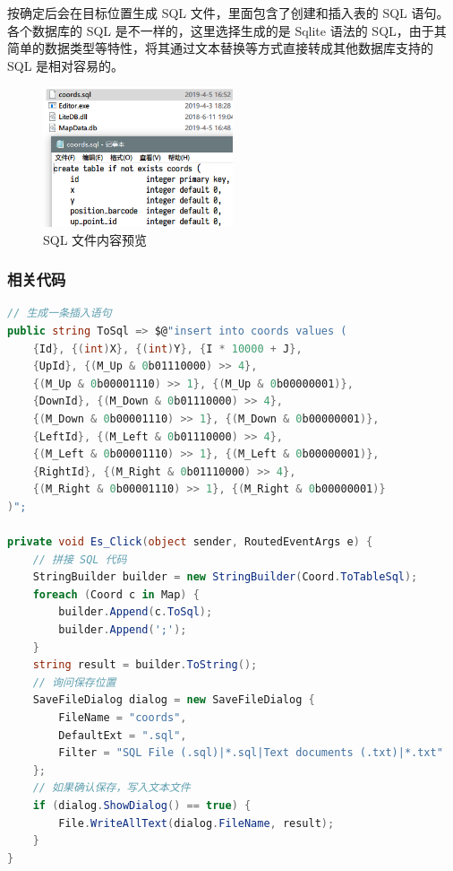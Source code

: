 按确定后会在目标位置生成 SQL 文件，里面包含了创建和插入表的 SQL 语句。各个数据库的 SQL 是不一样的，这里选择生成的是 Sqlite 语法的 SQL，由于其简单的数据类型等特性，将其通过文本替换等方式直接转成其他数据库支持的 SQL 是相对容易的。

\begin{figure}[H]
  \centering
  \includegraphics[width=0.5\textwidth]{assets/sql.png}
  \caption{SQL 文件内容预览}
  \label{fig:sql}
\end{figure}

\subsubsection{相关代码}

\begin{lstlisting}[language=cs]
// 生成一条插入语句
public string ToSql => $@"insert into coords values (
    {Id}, {(int)X}, {(int)Y}, {I * 10000 + J},
    {UpId}, {(M_Up & 0b01110000) >> 4},
    {(M_Up & 0b00001110) >> 1}, {(M_Up & 0b00000001)},
    {DownId}, {(M_Down & 0b01110000) >> 4},
    {(M_Down & 0b00001110) >> 1}, {(M_Down & 0b00000001)},
    {LeftId}, {(M_Left & 0b01110000) >> 4},
    {(M_Left & 0b00001110) >> 1}, {(M_Left & 0b00000001)},
    {RightId}, {(M_Right & 0b01110000) >> 4},
    {(M_Right & 0b00001110) >> 1}, {(M_Right & 0b00000001)}
)";

private void Es_Click(object sender, RoutedEventArgs e) {
    // 拼接 SQL 代码
    StringBuilder builder = new StringBuilder(Coord.ToTableSql);
    foreach (Coord c in Map) {
        builder.Append(c.ToSql);
        builder.Append(';');
    }
    string result = builder.ToString();
    // 询问保存位置
    SaveFileDialog dialog = new SaveFileDialog {
        FileName = "coords",
        DefaultExt = ".sql",
        Filter = "SQL File (.sql)|*.sql|Text documents (.txt)|*.txt"
    };
    // 如果确认保存，写入文本文件
    if (dialog.ShowDialog() == true) {
        File.WriteAllText(dialog.FileName, result);
    }
}
\end{lstlisting}
